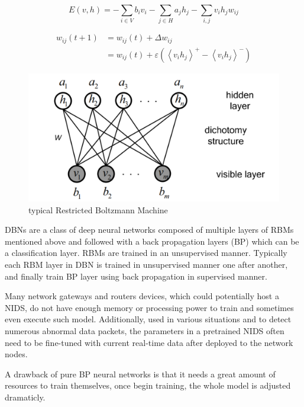\documentclass[conference]{IEEEtran}
\begin{document}
\begin{equation}
\label{eq:rbm_energy}
E(v, h)=-\sum_{i \in V} b_{i} v_{i}-\sum_{j \in H} a_{j} h_{j}-\sum_{i, j} v_{i} h_{j} w_{i j}
\end{equation}

\begin{equation}
\begin{aligned}
w_{i j}(t+1) &= w_{i j}(t)+\Delta w_{i j}\\
&= w_{i j}(t)+\varepsilon\left(\left\langle v_{i} h_{j}\right\rangle^{+}-\left\langle v_{i} h_{j}\right\rangle^{-}\right)
\end{aligned}
\label{eq:rbm_weight_update}
\end{equation}

\begin{figure}[ht]
\centering
\includegraphics[scale=0.35]{pictures/RBM.PNG}
\caption{typical Restricted Boltzmann Machine}
\label{fig:rbm}
\end{figure}

DBNs are a class of deep neural networks composed of multiple layers of RBMs mentioned above and followed with a back propagation layers (BP) which can be a classification layer. RBMs are trained in an unsupervised manner. Typically each RBM layer in DBN is trained in unsupervised manner one after another, and finally train BP layer using back propagation in supervised manner.

Many network gateways and routers devices, which could potentially host a NIDS, do not have enough memory or processing power to train and sometimes even execute such model. Additionally, used in various situations and to detect numerous abnormal data packets, the parameters in a pretrained NIDS often need to be fine-tuned with current real-time data
after deployed to the network nodes.

A drawback of pure BP neural networks is that it needs a great amount of resources to train themselves, once begin training, the whole model is adjusted dramaticly.
\end{document}
